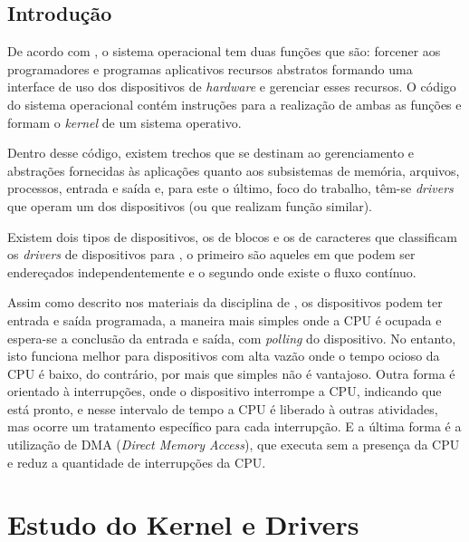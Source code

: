 \documentclass[
	12pt,			
	openright,			%
	twoside,			%
	a4paper,			%
	english,			%
	brazil,				%
	]{abntex2}
\begin{document}
\chapter*[Introdução]{Introdução}

De acordo com \textcite{TanenbaumBos14}, o sistema operacional tem duas
funções que são: forcener aos programadores e programas aplicativos recursos
abstratos formando uma interface de uso dos dispositivos de \emph{hardware} e gerenciar
esses recursos. O código do sistema operacional contém instruções para a
realização de ambas as funções e formam o \emph{kernel} de um sistema operativo.

Dentro desse código, existem trechos que se destinam ao gerenciamento
e abstrações fornecidas às aplicações quanto aos subsistemas de
memória, arquivos, processos, entrada e saída e, para este o último, foco do
trabalho, têm-se \emph{drivers} que operam um dos dispositivos (ou que realizam
função similar).

Existem dois tipos de dispositivos, os de blocos e os de caracteres que
classificam os \emph{drivers} de dispositivos para \textcite{TanenbaumBos14},
o primeiro são aqueles em que podem ser endereçados independentemente e o
segundo onde existe o fluxo contínuo.

Assim como descrito nos materiais da disciplina de \textcite{Slide7Rivalino},
os dispositivos podem ter entrada e saída programada, a maneira mais simples
onde a CPU é ocupada e espera-se a conclusão da entrada e saída, com
\emph{polling} do dispositivo. No entanto, isto funciona melhor para
dispositivos com alta vazão onde o tempo ocioso da CPU é baixo, do contrário,
por mais que simples não é vantajoso. Outra forma é orientado à interrupções, 
onde o dispositivo interrompe a CPU, indicando que está pronto, e nesse
intervalo de tempo a CPU é liberado à outras atividades, mas ocorre um
tratamento específico para cada interrupção. E a última forma é a utilização de
DMA (\emph{Direct Memory Access}), que executa sem a presença da CPU e reduz a
quantidade de interrupções da CPU.

\part{Estudo do Kernel e Drivers}
\end{document}
